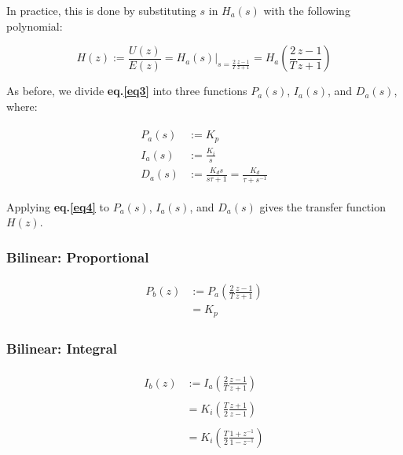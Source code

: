\documentclass[11pt]{article}
\theoremstyle{definition}
\begin{document}
In practice, this is done by substituting $s$ in $H_{a}(s)$ with the following polynomial:

\begin{equation} \label{eq4}
    \boxed{ 
    H(z) := \frac{U(z)}{E(z)} = H_{a}(s) \biggr\rvert_{s=\frac{2}{T}\frac{z-1}{z+1}} = H_{a}\left(\frac{2}{T}\frac{z-1}{z+1}\right)
    }
\end{equation}

As before, we divide \textbf{eq.\ref{eq3}} into three functions $P_{a}(s)$, $I_{a}(s)$, and $D_{a}(s)$, where:

\begin{align*}
\begin{split}
    P_{a}(s) &:= K_{p} \\
    I_{a}(s) &:= \frac{K_{i}}{s} \\
    D_{a}(s) &:= \frac{K_{d}s}{s\tau + 1} = \frac{K_{d}}{\tau + s^{-1}}
\end{split}
\end{align*}

Applying \textbf{eq.\ref{eq4}} to $P_{a}(s)$, $I_{a}(s)$, and $D_{a}(s)$ gives the transfer function $H(z)$.

\subsubsection{Bilinear: Proportional}

\begin{align*}
\begin{split}
    P_{b}(z) &:= P_{a}\left(\frac{2}{T}\frac{z-1}{z+1}\right) \\
             &= K_{p}
\end{split}
\end{align*}

\subsubsection{Bilinear: Integral}

\begin{align*}
\begin{split}
    I_{b}(z) &:= I_{a}\left(\frac{2}{T}\frac{z-1}{z+1}\right) \\\\
             &= K_{i}\left(\frac{T}{2}\frac{z+1}{z-1}\right) \\\\
             &= K_{i}\left(\frac{T}{2}\frac{1+z^{-1}}{1-z^{-1}}\right)
\end{split}
\end{align*}
\end{document}

